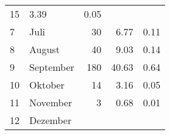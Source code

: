 \begin{longtable}{lXrrr}
       \num{15} &
       \num[round-mode=places,round-precision=2]{3.39} &
         \num[round-mode=places,round-precision=2]{0.05} \\

     7 &
     \multicolumn{1}{X}{ Juli   } &


       \num{30} &
       \num[round-mode=places,round-precision=2]{6.77} &
         \num[round-mode=places,round-precision=2]{0.11} \\

     8 &
     \multicolumn{1}{X}{ August   } &


       \num{40} &
       \num[round-mode=places,round-precision=2]{9.03} &
         \num[round-mode=places,round-precision=2]{0.14} \\

     9 &
     \multicolumn{1}{X}{ September   } &


       \num{180} &
       \num[round-mode=places,round-precision=2]{40.63} &
         \num[round-mode=places,round-precision=2]{0.64} \\

     10 &
     \multicolumn{1}{X}{ Oktober   } &


       \num{14} &
       \num[round-mode=places,round-precision=2]{3.16} &
         \num[round-mode=places,round-precision=2]{0.05} \\

     11 &
     \multicolumn{1}{X}{ November   } &


       \num{3} &
       \num[round-mode=places,round-precision=2]{0.68} &
         \num[round-mode=places,round-precision=2]{0.01} \\

     12 &
     \multicolumn{1}{X}{ Dezember   } &



\end{longtable}
